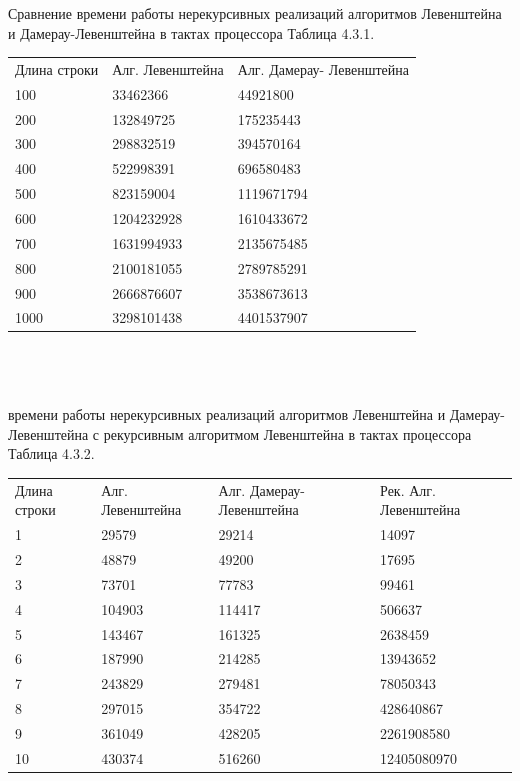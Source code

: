 \documentclass{article}
\begin{document}
\newpage
\small Сравнение времени работы нерекурсивных реализаций алгоритмов Левенштейна и Дамерау-Левенштейна в тактах процессора Таблица 4.3.1. \normalsize\\
\begin{tabular}{ | l | l | l |}
Длина строки  & Алг. Левенштейна & Алг. Дамерау- Левенштейна  \\
100 & 33462366 & 44921800  \\
200 & 132849725 & 175235443   \\
300 & 298832519 & 394570164 \\
400 & 522998391 & 696580483  \\
500 & 823159004 & 1119671794\\
600 & 1204232928 & 1610433672 \\
700 & 1631994933 & 2135675485  \\
800 & 2100181055 & 2789785291  \\
900 & 2666876607 & 3538673613 \\
1000 & 3298101438 & 4401537907\\
\end{tabular}
\\\\\\
 времени работы нерекурсивных реализаций алгоритмов Левенштейна и Дамерау-Левенштейна с рекурсивным алгоритмом Левенштейна в тактах процессора Таблица 4.3.2.\normalsize\\
\begin{tabular}{ | l | l | l | l |}
Длина строки  & Алг. Левенштейна & Алг. Дамерау- Левенштейна & Рек. Алг. Левенштейна \\
1 & 29579 & 29214 & 14097\\
2 & 48879 & 49200 & 17695 \\
3 & 73701 & 77783 & 99461 \\
4 & 104903 & 114417 & 506637\\
5 & 143467 & 161325 & 2638459\\
6 & 187990 & 214285 & 13943652\\
7 & 243829 & 279481& 78050343\\
8 & 297015 & 354722 & 428640867 \\
9 & 361049 & 428205 & 2261908580 \\
10 & 430374 & 516260 & 12405080970 \\
\end{tabular}
\end{document}
